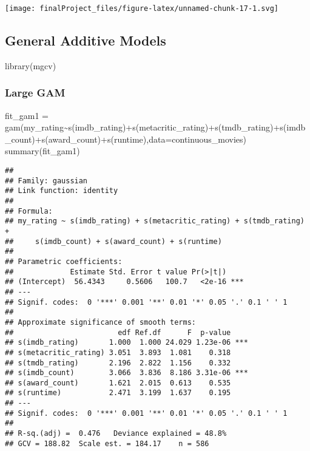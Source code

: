 \documentclass[
]{article}
\newenvironment{Shaded}{\begin{snugshade}}{\end{snugshade}}
\newcommand{\AttributeTok}[1]{\textcolor[rgb]{0.77,0.63,0.00}{#1}}
\newcommand{\FunctionTok}[1]{\textcolor[rgb]{0.00,0.00,0.00}{#1}}
\newcommand{\NormalTok}[1]{#1}
\newcommand{\OtherTok}[1]{\textcolor[rgb]{0.56,0.35,0.01}{#1}}
\newcommand{\SpecialCharTok}[1]{\textcolor[rgb]{0.00,0.00,0.00}{#1}}
\begin{document}
\texttt{[image: finalProject\_files/figure-latex/unnamed-chunk-17-1.svg]}

\hypertarget{general-additive-models}{%
\subsection{General Additive Models}\label{general-additive-models}}

\begin{Shaded}
\begin{Highlighting}[]
\FunctionTok{library}\NormalTok{(mgcv)}
\end{Highlighting}
\end{Shaded}

\hypertarget{large-gam}{%
\subsubsection{Large GAM}\label{large-gam}}

\begin{Shaded}
\begin{Highlighting}[]
\NormalTok{fit\_gam1 }\OtherTok{=} \FunctionTok{gam}\NormalTok{(my\_rating}\SpecialCharTok{\textasciitilde{}}\FunctionTok{s}\NormalTok{(imdb\_rating)}\SpecialCharTok{+}\FunctionTok{s}\NormalTok{(metacritic\_rating)}\SpecialCharTok{+}\FunctionTok{s}\NormalTok{(tmdb\_rating)}\SpecialCharTok{+}\FunctionTok{s}\NormalTok{(imdb\_count)}\SpecialCharTok{+}\FunctionTok{s}\NormalTok{(award\_count)}\SpecialCharTok{+}\FunctionTok{s}\NormalTok{(runtime),}\AttributeTok{data=}\NormalTok{continuous\_movies)}
\FunctionTok{summary}\NormalTok{(fit\_gam1)}
\end{Highlighting}
\end{Shaded}

\begin{verbatim}
## 
## Family: gaussian 
## Link function: identity 
## 
## Formula:
## my_rating ~ s(imdb_rating) + s(metacritic_rating) + s(tmdb_rating) + 
##     s(imdb_count) + s(award_count) + s(runtime)
## 
## Parametric coefficients:
##             Estimate Std. Error t value Pr(>|t|)    
## (Intercept)  56.4343     0.5606   100.7   <2e-16 ***
## ---
## Signif. codes:  0 '***' 0.001 '**' 0.01 '*' 0.05 '.' 0.1 ' ' 1
## 
## Approximate significance of smooth terms:
##                        edf Ref.df      F  p-value    
## s(imdb_rating)       1.000  1.000 24.029 1.23e-06 ***
## s(metacritic_rating) 3.051  3.893  1.081    0.318    
## s(tmdb_rating)       2.196  2.822  1.156    0.332    
## s(imdb_count)        3.066  3.836  8.186 3.31e-06 ***
## s(award_count)       1.621  2.015  0.613    0.535    
## s(runtime)           2.471  3.199  1.637    0.195    
## ---
## Signif. codes:  0 '***' 0.001 '**' 0.01 '*' 0.05 '.' 0.1 ' ' 1
## 
## R-sq.(adj) =  0.476   Deviance explained = 48.8%
## GCV = 188.82  Scale est. = 184.17    n = 586
\end{verbatim}
\end{document}
